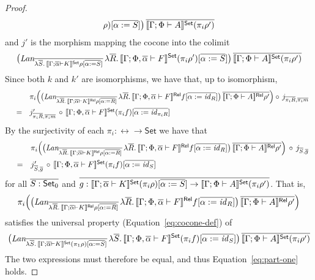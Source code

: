 \documentclass{lmcs}
\theoremstyle{plain}\newtheorem{satz}[thm]{Satz}
\newcommand{\set}{\mathsf{Set}}
\renewcommand{\id}{\mathit{id}}
\begin{document}
{\begin{proof}
\[\rho)[\ol{\alpha := S}]\big)\, \ol{\setsem{\Gamma; \Phi \vdash
    A}(\pi_i \rho')}
\]
and $j'$ is the morphism mapping the cocone into the colimit
\[
\big(\textit{Lan}_{\ol{\lambda \ol{S}.\,\setsem{\Gamma; \ol\alpha
      \vdash K}\rho[\ol{\alpha := S}]}}\, \lambda
\ol{R}.\,\setsem{\Gamma; \Phi, \ol\alpha \vdash F}(\pi_i
\rho')[\ol{\alpha := S}]\big)\, \ol{\setsem{\Gamma; \Phi \vdash
    A}(\pi_i \rho')}
\]
Since both $k$ and $k'$ are isomorphisms, we have that, up to
isomorphism, 
\[\begin{array}{lll}
& & \pi_i \Big( \big(\textit{Lan}_{\ol{\lambda
    \ol{R}.\,\relsem{\Gamma; \ol\alpha \vdash K}\rho[\ol{\alpha :=
        R}]}}\, \lambda \ol{R}.\,\relsem{\Gamma; \Phi, \ol\alpha
  \vdash F}f[\ol{\alpha := \id_R}]\big)\, \ol{\relsem{\Gamma; \Phi
    \vdash A}\rho'} \Big) \circ\, j_{\ol{\pi_i R},
  \ol{\pi_i m}} \\[2ex]
& = & j'_{\ol{\pi_i R}, \ol{\pi_i m}} \,\circ\, \setsem{\Gamma; \Phi,
      \ol\alpha \vdash F} (\pi_i f)[\ol{\alpha := \id_{\pi_i R}}]
\end{array}\]
By the surjectivity of each $\pi_i : \rel \to \set$ we have that
\[\begin{array}{lll}
& & \pi_i \Big( \big(\textit{Lan}_{\ol{\lambda
    \ol{R}.\,\relsem{\Gamma; 
      \ol\alpha \vdash K}\rho[\ol{\alpha := R}]}}\, \lambda
\ol{R}.\,\relsem{\Gamma; \Phi, \ol\alpha \vdash F}f[\ol{\alpha :=
    \id_R}]\big)\, \ol{\relsem{\Gamma; \Phi \vdash A}\rho'} \Big)
\,\circ\, j_{\ol{S}, \ol{g}} \\[2ex]
& = & j'_{\ol{S}, \ol{g}} \,\circ\, \setsem{\Gamma; \Phi, \ol\alpha
  \vdash F} (\pi_i f)[\ol{\alpha := \id_{S}}]
\end{array}\]
for all $\ol{S: \set_0}$ and $\ol{g : \setsem{\Gamma; \ol\alpha \vdash
    K}(\pi_i \rho)[\ol{\alpha := S}] \to \setsem{\Gamma; \Phi \vdash
    A}(\pi_i \rho')}$.  That is, \[\pi_i \Big(
\big(\textit{Lan}_{\ol{\lambda \ol{R}.\,\relsem{\Gamma; \ol\alpha
      \vdash K}\rho[\ol{\alpha := R}]}}\, \lambda
\ol{R}.\,\relsem{\Gamma; \Phi, \ol\alpha \vdash F}f[\ol{\alpha :=
    \id_R}]\big)\, \ol{\relsem{\Gamma; \Phi \vdash A}\rho'} \Big)\]
satisfies the universal property (Equation~\ref{eq:cocone-def}) of 
\[
\big(\textit{Lan}_{\ol{\lambda \ol{S}.\,\setsem{\Gamma; \ol\alpha
      \vdash K} (\pi_1 \rho) [\ol{\alpha := S}]}}\, \lambda
\ol{S}.\,\setsem{\Gamma; \Phi, \ol\alpha \vdash F}(\pi_i f)[\ol{\alpha
    := \id_S}]\big)\, \ol{\setsem{\Gamma; \Phi \vdash A}(\pi_i \rho')}
\]
The two expressions must therefore be equal, and thus
Equation~\ref{eq:part-one} holds.


\end{proof}}
\end{document}
